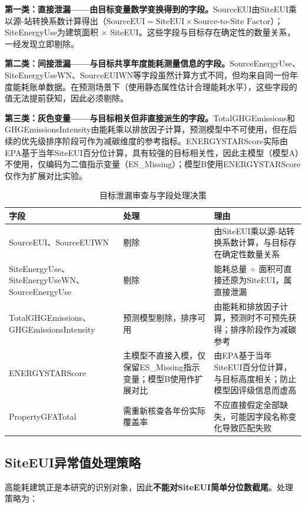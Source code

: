 \textbf{第一类：直接泄漏——由目标变量数学变换得到的字段。}SourceEUI由SiteEUI乘以源-站转换系数计算得出（$\text{SourceEUI} = \text{SiteEUI} \times \text{Source-to-Site Factor}$）；SiteEnergyUse为建筑面积 $\times$ SiteEUI。这些字段与目标存在确定性的数量关系，一经发现立即剔除。

\textbf{第二类：间接泄漏——与目标共享年度能耗测量信息的字段。}SourceEnergyUse、SiteEnergyUseWN、SourceEUIWN等字段虽然计算方式不同，但均来自同一份年度能耗账单数据。在预测场景下（使用静态属性估计合理能耗水平），这些字段的值无法提前获知，因此必须剔除。

\textbf{第三类：灰色变量——与目标相关但非直接派生的字段。}TotalGHGEmissions和GHGEmissionsIntensity由能耗乘以排放因子计算，预测模型中不可使用，但在后续的优先级排序阶段可作为减碳维度的参考指标。ENERGYSTARScore实际由EPA基于当年SiteEUI百分位计算，具有较强的目标相关性，因此主模型（模型A）不使用，仅编码为二值指示变量（ES\_Missing）；模型B使用ENERGYSTARScore仅作为扩展对比实验。

\begin{table}[H]
\centering
\caption{目标泄漏审查与字段处理决策}
\label{tab:leakage}
\begin{tabular}{p{3.5cm}p{2.5cm}p{6cm}}
\hline
\textbf{字段} & \textbf{处理} & \textbf{理由} \\
\hline
SourceEUI、SourceEUIWN & 剔除 & 由SiteEUI乘以源-站转换系数计算，与目标存在确定性数量关系 \\
\hline
SiteEnergyUse、SiteEnergyUseWN、SourceEnergyUse & 剔除 & 能耗总量 $\div$ 面积可直接还原为SiteEUI，属直接泄漏 \\
\hline
TotalGHGEmissions、GHGEmissionsIntensity & 预测模型剔除，排序可用 & 由能耗和排放因子计算，预测时不可预先获得；排序阶段作为减碳参考 \\
\hline
ENERGYSTARScore & 主模型不直接入模，仅保留ES\_Missing指示变量；模型B使用作扩展对比 & 由EPA基于当年SiteEUI百分位计算，与目标高度相关；防止模型因评级信息而虚高 \\
\hline
PropertyGFATotal & 需重新核查各年份实际覆盖率 & 不应直接假定全部缺失，可能因字段名称变化导致匹配失败 \\
\hline
\end{tabular}
\end{table}

\subsection{SiteEUI异常值处理策略}

高能耗建筑正是本研究的识别对象，因此\textbf{不能对SiteEUI简单分位数截尾}。处理策略为：

